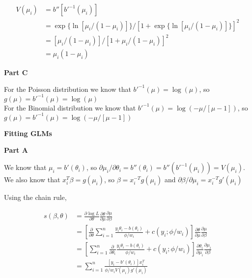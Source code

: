 \documentclass[12pt]{amsart}
\begin{document}
\begin{align*}
    V(\mu_i)&=b''[b'^{-1}(\mu_i)]\\
    &=\exp\{\ln [\mu_i/(1-\mu_i)]\}/[1+\exp\{\ln [\mu_i/(1-\mu_i)]\} ]^2\\
    &= [\mu_i/(1-\mu_i)]/[1+\mu_i/(1-\mu_i)]^2\\
    &=\mu_i(1-\mu_i)
\end{align*}

{\bf Part C} \\
\bigskip
\bigskip

For the Poisson distribution we know that $b'^{-1}(\mu)=\log(\mu)$, so $g(\mu)=b'^{-1}(\mu) = \log(\mu)$\\

 
For the Binomial distribution we know that $b'^{-1}(\mu)=\log(-\mu/[\mu-1])$, so $g(\mu)=b'^{-1}(\mu) = \log(-\mu/[\mu-1])$

\bigskip
\bigskip


{\bf \large Fitting GLMs} \\
\bigskip
\bigskip

{\bf Part A
} \\
\bigskip
\bigskip

We know that $\mu_i = b'(\theta_i)$, so $\partial \mu_i / \partial \theta_i=b''(\theta_i) = b''(b'^{-1}(\mu_i))=V(\mu_i)$. \\

We also know that $x_i^T\beta = g(\mu_i)$, so $\beta = x_i^{-T}g(\mu_i)$ and $\partial \beta/ \partial \mu_i=x_i^{-T}g'(\mu_i)$

Using the chain rule, 

\begin{align*}
    s(\beta, \theta) &= \frac{\partial \log L}{\partial  \theta}  \frac{\partial \theta}{\partial \mu} \frac{\partial \mu}{\partial \beta}\\
    &= [ \frac{\partial}{\partial  \theta}   \sum_{i=1}^{n} \frac{y_i\theta_i-b(\theta_i)}{\phi/w_i} + c(y_i; \phi/w_i)]
    \frac{\partial \theta}{\partial \mu}  \frac{\partial \mu}{\partial \beta}\\
    &= [   \sum_{i=1}^{n} \frac{\partial}{\partial  \theta_i}  \frac{y_i\theta_i-b(\theta_i)}{\phi/w_i} + c(y_i; \phi/w_i)]
    \frac{\partial \theta_i}{\partial \mu_i}  \frac{\partial \mu_i}{\partial \beta}\\
    &=   \sum_{i=1}^{n} \frac{[y_i-b'(\theta_i)]x_i^T }{\phi/w_i V(\mu_i) g'(\mu_i)} 
\end{align*}

\bigskip
\end{document}
